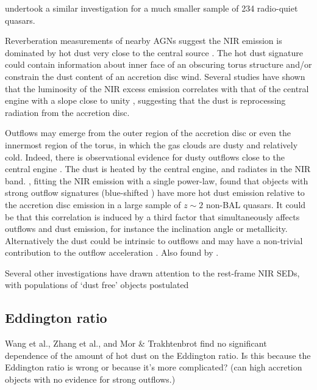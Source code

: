 \citet{gallagher07} undertook a similar investigation for a much smaller sample of 234 radio-quiet quasars.

Reverberation measurements of nearby \ac{AGN}s suggest the \ac{NIR} emission is dominated by hot dust very close to the central source \citep[few tens of light days; e.g.][]{minezaki04,suganuma06}. 
The hot dust signature could contain information about inner face of an obscuring torus structure and/or constrain the dust content of an accretion disc wind. 
Several studies have shown that the luminosity of the \ac{NIR} excess emission correlates with that of the central engine with a slope close to unity \cite[e.g.][]{gallagher07}, suggesting that the dust is reprocessing radiation from the accretion disc. 

Outflows may emerge from the outer region of the accretion disc or even the innermost region of the torus, in which the gas clouds are dusty and relatively cold.  
Indeed, there is observational evidence for dusty outflows close to the central engine \citep[e.g.][]{bowler14}.
The dust is heated by the central engine, and radiates in the \ac{NIR} band. 
\citet{wang13}, fitting the \ac{NIR} emission with a single power-law, found that objects with strong outflow signatures (blue-shifted ) have more hot dust emission relative to the accretion disc emission in a large sample of $z\sim2$ non-BAL quasars. 
It could be that this correlation is induced by a third factor that simultaneously affects outflows and dust emission, for instance the inclination angle or metallicity. 
Alternatively the dust could be intrinsic to outflows and may have a non-trivial contribution to the outflow acceleration \citep[e.g.][]{fabian12}. 
Also found by \citet{shen14}. 

Several other investigations have drawn attention to the rest-frame \ac{NIR} \ac{SED}s, with populations of `dust free' objects postulated \citep{hao10,hao11,jiang10,mor11} 


\subsection{Eddington ratio}

Wang et al., Zhang et al., and Mor \& Trakhtenbrot find no significant dependence of the amount of hot dust on the Eddington ratio. 
Is this because the Eddington ratio is wrong or because it's more complicated? (can high accretion objects with no evidence for strong outflows.)

